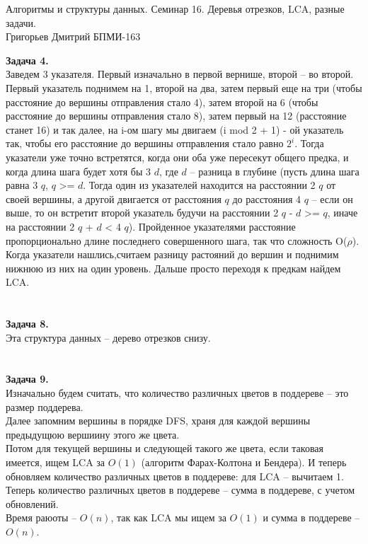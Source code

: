 \documentclass[12pt,a4paper]{scrartcl}
\begin{document}
	\begin{center}	
		Алгоритмы и структуры данных. Семинар 16.
		Деревья отрезков, LCA, разные задачи. \\
		Григорьев Дмитрий БПМИ-163\\
	\end{center}
	\textbf{Задача 4.} \\
	Заведем 3 указателя. Первый изначально в первой вернише, второй -- во второй.\\
	Первый указатель поднимем на 1, второй на два, затем первый еще на три (чтобы расстояние до вершины отправления стало 4), затем второй на 6 (чтобы расстояние до вершины отправления стало 8), затем первый на 12 (расстояние станет 16) и так далее, на i-ом шагу мы двигаем (i mod 2 + 1) - ой указатель так, чтобы его расстояние до вершины отправления стало равно $2^i$.
	Тогда указатели уже точно встретятся, когда они оба уже пересекут общего предка, и когда длина шага будет хотя бы 3 $d$, где $d$ -- разница в глубине (пусть длина шага равна 3 $q$, $q$ >= $d$. Тогда один из указателей находится на расстоянии 2 $q$ от своей вершины, а другой двигается от расстояния $q$ до расстояния 4 $q$ -- если он выше, то он встретит второй указатель будучи на расстоянии 2 $q$ - $d$ >= $q$, иначе на расстоянии 2 $q$ + $d$ < 4 $q$). Пройденное указателями расстояние пропорционально длине последнего совершенного шага, так что сложность O($\rho$). \\
	Когда указатели нашлись,считаем разницу растояний до вершин и поднимим нижнюю из них на один уровень. Дальше просто переходя к предкам найдем LCA. \\
	\\
	\\
	\textbf{Задача 8.} \\
	Эта структура данных -- дерево отрезков снизу.
	\\
	\\
	\\
	\textbf{Задача 9.} \\
	Изначально будем считать, что количество различных цветов в поддереве -- это размер поддерева. \\
	Далее запомним вершины в порядке DFS, храня для каждой вершины предыдущюю вершиину этого же цвета. \\
	Потом для текущей вершины и следующей такого же цвета, если таковая имеется, ищем LCA за ${O}(1)$ (алгоритм Фарах-Колтона и Бендера). И теперь обновляем количество различных цветов в поддереве: для LCA -- вычитаем 1. \\
	Теперь количество различных цветов в поддереве -- сумма в поддереве, с учетом обновлений. \\
	Время раюоты -- $O(n)$, так как LCA мы ищем за $O(1)$ и сумма в поддереве -- $O(n)$. 
	
\end{document}
